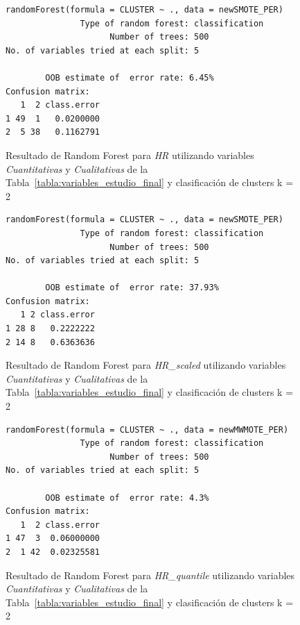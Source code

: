 \begin{figure}[H]
    \centering
    \begin{lstlisting}[frame=single, basicstyle=\small\ttfamily]
        randomForest(formula = CLUSTER ~ ., data = newSMOTE_PER) 
               Type of random forest: classification
                     Number of trees: 500
No. of variables tried at each split: 5

        OOB estimate of  error rate: 6.45%
Confusion matrix:
   1  2 class.error
1 49  1   0.0200000
2  5 38   0.1162791
    \end{lstlisting}
    \caption{Resultado de Random Forest para \textit{HR} utilizando variables \textit{Cuantitativas} y \textit{Cualitativas} de la Tabla~\ref{tabla:variables_estudio_final} y clasificación de clusters k = 2}\label{fig:random_forest_per_result_1}
\end{figure}
\begin{figure}[H]
    \centering
    \begin{lstlisting}[frame=single, basicstyle=\small\ttfamily]
        randomForest(formula = CLUSTER ~ ., data = newSMOTE_PER) 
               Type of random forest: classification
                     Number of trees: 500
No. of variables tried at each split: 5

        OOB estimate of  error rate: 37.93%
Confusion matrix:
   1 2 class.error
1 28 8   0.2222222
2 14 8   0.6363636
    \end{lstlisting}
    \caption{Resultado de Random Forest para \textit{HR\_scaled} utilizando variables \textit{Cuantitativas} y \textit{Cualitativas} de la Tabla~\ref{tabla:variables_estudio_final} y clasificación de clusters k = 2}
    \label{fig:random_forest_per_result_2}
\end{figure}

\begin{figure}[H]
    \centering
    \begin{lstlisting}[frame=single, basicstyle=\small\ttfamily]
        randomForest(formula = CLUSTER ~ ., data = newMWMOTE_PER) 
               Type of random forest: classification
                     Number of trees: 500
No. of variables tried at each split: 5

        OOB estimate of  error rate: 4.3%
Confusion matrix:
   1  2 class.error
1 47  3  0.06000000
2  1 42  0.02325581
    \end{lstlisting}
    \caption{Resultado de Random Forest para \textit{HR\_quantile} utilizando variables \textit{Cuantitativas} y \textit{Cualitativas} de la Tabla~\ref{tabla:variables_estudio_final} y clasificación de clusters k = 2}
    \label{fig:random_forest_per_result_3}
\end{figure}

